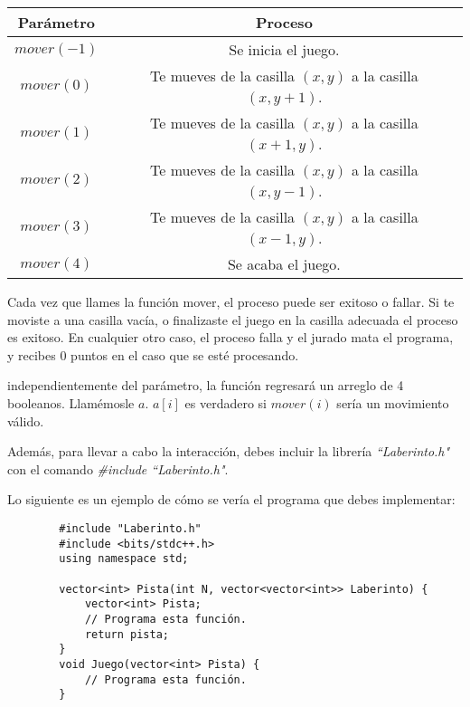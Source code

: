 \documentclass[12pt]{scrartcl}
\begin{document}
    \begin{center}
        \begin{tabular}{|c|c|}
            \hline
            {\bfseries Parámetro} & {\bfseries Proceso}\\
            \hline
             $mover(-1)$ & Se inicia el juego. \\
             \hline
             $mover(0)$ &  Te mueves de la casilla $(x, y)$ a la casilla $(x, y + 1)$. \\
             \hline
             $mover(1)$ & Te mueves de la casilla $(x, y)$ a la casilla $(x + 1, y)$.\\
             \hline
             $mover(2)$ & Te mueves de la casilla $(x, y)$ a la casilla $(x, y - 1)$.\\
             \hline
             $mover(3)$ & Te mueves de la casilla $(x, y)$ a la casilla $(x - 1, y)$.\\
             \hline
             $mover(4)$ & Se acaba el juego.\\
             \hline
        \end{tabular}
    \end{center}

    Cada vez que llames la función mover, el proceso puede ser exitoso o fallar.  Si te moviste a una casilla vacía, o finalizaste el juego en la casilla adecuada el proceso es exitoso. En cualquier otro caso, el proceso falla y el jurado mata el programa, y recibes 0 puntos en el caso que se esté procesando.
    
    
    independientemente del parámetro, la función regresará  un arreglo de 4 booleanos. Llamémosle $a$. $a[i]$ es verdadero si $mover(i)$ sería un movimiento válido. 

    Además, para llevar a cabo la interacción, debes incluir la librería \textit{``Laberinto.h"} con el comando \textit{\#include ``Laberinto.h"}.
    
    Lo siguiente es un ejemplo de cómo se vería el programa que debes implementar:
    
    \begin{verbatim}
        #include "Laberinto.h"
        #include <bits/stdc++.h>
        using namespace std;
        
        vector<int> Pista(int N, vector<vector<int>> Laberinto) {
            vector<int> Pista;
            // Programa esta función.
            return pista;
        }
        void Juego(vector<int> Pista) {
            // Programa esta función.
        }
        
    \end{verbatim}
\end{document}
